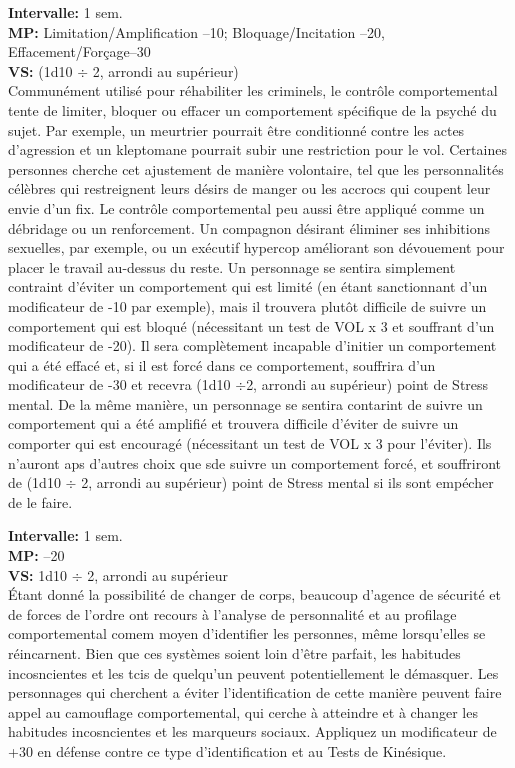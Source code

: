  \textbf{Intervalle:} 1 sem. \\ \textbf{MP:} Limitation/Amplification –10; Bloquage/Incitation –20, Effacement/Forçage–30 \\ \textbf{VS:} (1d10 $\div$ 2, arrondi au supérieur) \\ Communément utilisé pour réhabiliter les criminels, le contrôle comportemental tente de limiter, bloquer ou effacer un comportement spécifique de la psyché du sujet. Par exemple, un meurtrier pourrait être conditionné contre les actes d'agression et un kleptomane pourrait subir une restriction pour le vol. Certaines personnes cherche cet ajustement de manière volontaire, tel que les personnalités célèbres qui restreignent leurs désirs de manger ou les accrocs qui coupent leur envie d'un fix. Le contrôle comportemental peu aussi être appliqué comme un débridage ou un renforcement. Un compagnon désirant éliminer ses inhibitions sexuelles, par exemple, ou un exécutif hypercop améliorant son dévouement pour placer le travail au-dessus du reste. Un personnage se sentira simplement contraint d'éviter un comportement qui est limité (en étant sanctionnant d'un modificateur de -10 par exemple), mais il trouvera plutôt difficile de suivre un comportement qui est bloqué (nécessitant un test de VOL x 3 et souffrant d'un modificateur de -20). Il sera complètement incapable d'initier un comportement qui a été effacé et, si il est forcé dans ce comportement, souffrira d'un modificateur de -30 et recevra (1d10 $\div $2, arrondi au supérieur) point de Stress mental. De la même manière, un personnage se sentira contarint de suivre un comportement qui a été amplifié et trouvera difficile d'éviter de suivre un comporter qui est encouragé (nécessitant un test de VOL x 3 pour l'éviter). Ils n'auront aps d'autres choix que sde suivre un comportement forcé, et souffriront de (1d10 $\div$ 2, arrondi au supérieur) point de Stress mental si ils sont empécher de le faire. 

 \textbf{Intervalle:} 1 sem. \\ \textbf{MP:} –20 \\ \textbf{VS:} 1d10 $\div$ 2, arrondi au supérieur\\ Étant donné la possibilité de changer de corps, beaucoup d'agence de sécurité et de forces de l'ordre ont recours à l'analyse de personnalité et au profilage comportemental comem moyen d'identifier les personnes, même lorsqu'elles se réincarnent. Bien que ces systèmes soient loin d'être parfait, les habitudes incosncientes et les tcis de quelqu'un peuvent potentiellement le démasquer. Les personnages qui cherchent a éviter l'identification de cette manière peuvent faire appel au camouflage comportemental, qui cerche à atteindre et à changer les habitudes incosncientes et les marqueurs sociaux. Appliquez un modificateur de +30 en défense contre ce type d'identification et au Tests de Kinésique. 

